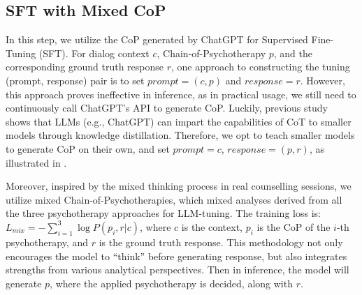 \subsection{SFT with Mixed CoP}
\label{sec:mix}
In this step, we utilize the CoP generated by ChatGPT for Supervised Fine-Tuning (SFT).
For dialog context $c$, Chain-of-Psychotherapy $p$, and the corresponding ground truth response $r$, one approach to constructing the tuning (prompt, response) pair is to set $prompt=(c, p)$ and $response = r$. However, this approach proves ineffective in inference, as in practical usage, we still need to continuously call ChatGPT's API to generate CoP. Luckily, previous study~\cite{magister-etal-2023-teaching} shows that LLMs (e.g., ChatGPT) can impart the capabilities of CoT to smaller models through knowledge distillation. Therefore, we opt to teach smaller models to generate CoP on their own, and set $prompt=c$, $response = (p, r)$, as illustrated in . 

Moreover, inspired by the mixed thinking process in real counselling sessions, we utilize mixed Chain-of-Psychotherapies, which mixed analyses derived from all the three psychotherapy approaches for LLM-tuning. The training loss is: $L_{mix} = -\sum^3_{i=1} \log P(p_i, r| c)$,
where $c$ is the context, $p_i$ is the CoP of the $i$-th psychotherapy, and $r$ is the ground truth response.
This methodology not only encourages the model to ``think'' before generating response, but also integrates strengths from various analytical perspectives. Then in inference, the model will generate $p$, where the applied psychotherapy is decided, along with $r$.






